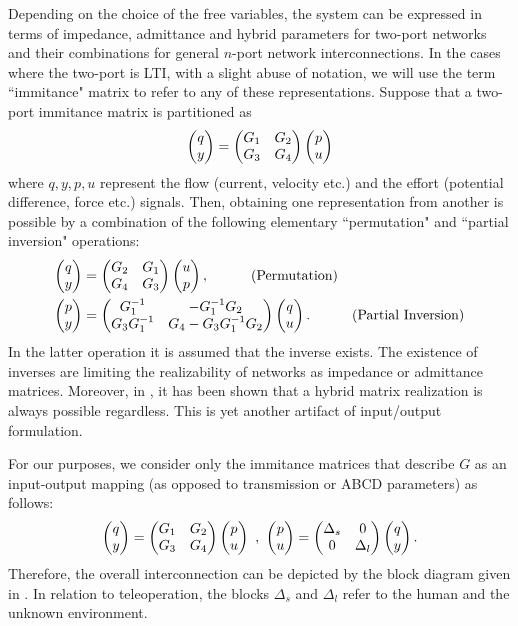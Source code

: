 Depending on the choice of the free variables, the system can be expressed in terms of impedance, admittance 
and hybrid parameters for two-port networks and their combinations for general $n$-port network interconnections. 
In the cases where the two-port is LTI, with a slight abuse of notation, we will use the term ``immitance" matrix to refer to 
any of these representations. Suppose that a two-port immitance matrix is partitioned as
\[
\begin{pmatrix}q\\y\end{pmatrix}=\begin{pmatrix}G_1 &G_2\\G_3 &G_4\end{pmatrix}\begin{pmatrix}p\\u\end{pmatrix}
\]
where $q,y,p,u$ represent the flow (current, velocity etc.) and the effort (potential difference, force etc.) signals. Then, 
obtaining one representation from another is possible by a combination of the following elementary ``permutation" and 
``{partial} inversion" operations:
\begin{align*}
\begin{pmatrix}q\\y\end{pmatrix}&=\begin{pmatrix}G_2 &G_1\\G_4 &G_3\end{pmatrix}\begin{pmatrix}u\\p\end{pmatrix}, \ \ \ \tag{Permutation}\\
\begin{pmatrix}p\\y\end{pmatrix}&=\begin{pmatrix}G_1^{-1} &-G_1^{-1}G_2\\G_3G_1^{-1} &G_4-G_3G_1^{-1}G_2\end{pmatrix}\begin{pmatrix}q\\u\end{pmatrix}. \ \ \ \tag{Partial Inversion}
\end{align*}
In the latter operation it is assumed that the inverse exists. The existence of inverses are limiting the realizability
of networks as impedance or admittance matrices. Moreover, in \cite{andersonHmat}, it has been shown that a hybrid matrix
realization is always possible regardless. This is yet another artifact of input/output formulation. 



For our purposes, we consider only the immitance 
matrices that describe $G$ as an input-output mapping (as opposed to transmission or ABCD parameters) as {follows}:
\begin{equation}
\begin{pmatrix}q\\y\end{pmatrix}=\begin{pmatrix}G_1 &G_2\\G_3 &G_4\end{pmatrix}\begin{pmatrix}p\\u\end{pmatrix} \ , \ \begin{pmatrix}p\\u\end{pmatrix}=\begin{pmatrix}\Delta_s &0\\0&\Delta_l\end{pmatrix} \begin{pmatrix}q\\y\end{pmatrix}.
\end{equation}
Therefore, the overall interconnection can be {depicted} by the block diagram given in . 
In relation to teleoperation, the {blocks} $\Delta_s$ and $\Delta_l$ refer to the human and the unknown environment. 



